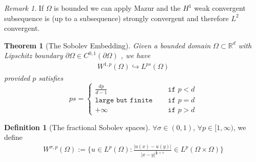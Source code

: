 \documentclass[a4paper,11pt,oneside,fleqn]{book}
\newtheorem{theorem}{Theorem}[section]
\theoremstyle{definition}
\newtheorem{definition}{Definition}[section]
\theoremstyle{remark}
\newtheorem*{remark}{Remark}
\begin{document}
\begin{remark}
If $\Omega$ is bounded we can apply Mazur and the $H^1$ weak convergent subsequence is (up to a subsequence) strongly convergent and therefore $L^2$ convergent. 
\end{remark}

\begin{theorem}[The Sobolev Embedding]
	Given a bounded domain $\Omega \subset \mathbb{R}^d$ with Lipschitz boundary $\partial\Omega \in C^{0, 1}(\partial\Omega)$ , we have
	\begin{align*}
		W^{1, p}(\Omega) \hookrightarrow L^{ps}(\Omega)
	\end{align*} 
	provided $p$ satisfies
	\begin{equation}
	ps = \left\{
	\begin{aligned}
		 \frac{dp}{d - 1} &\texttt{ if } p < d\\
		\texttt{large but finite} \quad &\texttt{ if } p = d\\
		+ \infty \quad  &\texttt{ if } p > d
	\end{aligned}
	\right.
	\end{equation}
\end{theorem}

\begin{definition}[The fractional Sobolev spaces]
	$\forall \sigma \in (0, 1)$, $\forall p \in [1, \infty)$, we define 
	\begin{align*}
		W^{\sigma, p}(\Omega):= \bigg\{ u \in L^p(\Omega): \frac{|u(x) - u(y)|}{|x - y|^{\frac{p}{n} + s}} \in L^p(\Omega \times \Omega) \bigg\}
	\end{align*}
\end{definition}
\end{document}
